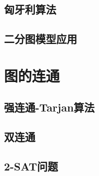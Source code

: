 \documentclass[fontset=ubuntu]{ctexbook}
\begin{document}
    \subsection{匈牙利算法}
    \subsection{二分图模型应用}
    \section{图的连通}
    \subsection{强连通-Tarjan算法}
    \subsection{双连通}
    \subsection{2-SAT问题}
\end{document}
